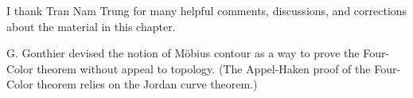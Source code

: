 \bigskip

\begin{note} %
 I thank Tran Nam Trung for many helpful comments, discussions, and corrections about the material in this chapter.
\end{note}

\begin{remark}
G. Gonthier devised the notion of M\"obius contour as a way to prove the Four-Color theorem without appeal to topology.  (The Appel-Haken proof of the Four-Color theorem relies on the Jordan curve theorem.)  
\end{remark}


